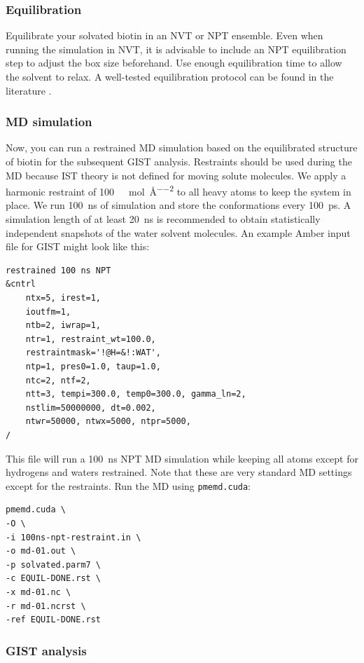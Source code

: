 \documentclass[9pt,tutorial]{livecoms}
\newcommand{\software}{\texttt}
\begin{document}
\subsubsection{Equilibration}
Equilibrate your solvated biotin in an NVT or NPT ensemble.
Even when running the simulation in NVT, it is advisable to include an NPT equilibration step to adjust the box size beforehand.
Use enough equilibration time to allow the solvent to relax. 
A well-tested equilibration protocol can be found in the literature \cite{Roe2020-equilibration}.

\subsubsection{MD simulation}
\label{sec:md_simulation}
Now, you can run a restrained MD simulation based on the equilibrated structure of biotin for the subsequent GIST analysis.
Restraints should be used during the MD because IST theory is not defined for moving solute molecules.
We apply a harmonic restraint of \SI{100}{\kilo\calorie\per\mole\per\angstrom\squared} to all heavy atoms to keep the system in place.
We run \SI{100}{\nano\second} of simulation and store the conformations every \SI{100}{\pico\second}.
A simulation length of at least \SI{20}{\nano\second} is recommended to obtain statistically independent snapshots of the water solvent molecules. 
An example Amber input file for GIST might look like this:
\begin{lstlisting}[style=amber-in]
restrained 100 ns NPT
&cntrl
	ntx=5, irest=1,
	ioutfm=1,
	ntb=2, iwrap=1,
	ntr=1, restraint_wt=100.0,
	restraintmask='!@H=&!:WAT',
	ntp=1, pres0=1.0, taup=1.0,
	ntc=2, ntf=2,
	ntt=3, tempi=300.0, temp0=300.0, gamma_ln=2,
	nstlim=50000000, dt=0.002,
	ntwr=50000, ntwx=5000, ntpr=5000,
/
\end{lstlisting}
This file will run a \SI{100}{\nano\second} NPT MD simulation while keeping all atoms except for hydrogens and waters restrained.
Note that these are very standard MD settings except for the restraints.
Run the MD using \software{pmemd.cuda}:
\begin{lstlisting}[style=bash]
pmemd.cuda \
-O \
-i 100ns-npt-restraint.in \
-o md-01.out \
-p solvated.parm7 \
-c EQUIL-DONE.rst \
-x md-01.nc \
-r md-01.ncrst \
-ref EQUIL-DONE.rst
\end{lstlisting}
\subsubsection{GIST analysis}
\end{document}
